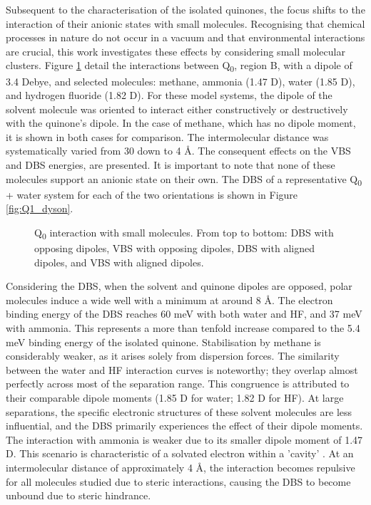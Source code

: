 Subsequent to the characterisation of the isolated quinones, the focus shifts to the interaction of their anionic states with small molecules. Recognising that chemical processes in nature do not occur in a vacuum and that environmental interactions are crucial, this work investigates these effects by considering small molecular clusters. Figure \ref{fig:scan_X} detail the interactions between Q\textsubscript{0}, region B, with a dipole of 3.4 Debye, and selected molecules: methane, ammonia (1.47 D), water (1.85 D), and hydrogen fluoride (1.82 D). For these model systems, the dipole of the solvent molecule was oriented to interact either constructively or destructively with the quinone's dipole. In the case of methane, which has no dipole moment, it is shown in both cases for comparison. The intermolecular distance was systematically varied from 30 down to 4 \r{A}. The consequent effects on the VBS and DBS energies, are presented. It is important to note that none of these molecules support an anionic state on their own. The DBS of a representative Q\textsubscript{0} + water system for each of the two orientations is shown in Figure \ref{fig:Q1_dyson}.

\begin{figure}[th!]
    \centering
    \small
    
    \caption[Q\textsubscript{0} interaction with small molecules]{Q\textsubscript{0} interaction with small molecules. From top to bottom: DBS with opposing dipoles, VBS with opposing dipoles, DBS with aligned dipoles, and VBS with aligned dipoles.}
    \label{fig:scan_X}
\end{figure}

Considering the DBS, when the solvent and quinone dipoles are opposed, polar molecules induce a wide well with a minimum at around 8 \r{A}. The electron binding energy of the DBS reaches 60 meV with both water and HF, and 37 meV with ammonia. This represents a more than tenfold increase compared to the 5.4 meV binding energy of the isolated quinone. Stabilisation by methane is considerably weaker, as it arises solely from dispersion forces. The similarity between the water and HF interaction curves is noteworthy; they overlap almost perfectly across most of the separation range. This congruence is attributed to their comparable dipole moments (1.85 D for water; 1.82 D for HF). At large separations, the specific electronic structures of these solvent molecules are less influential, and the DBS primarily experiences the effect of their dipole moments. The interaction with ammonia is weaker due to its smaller dipole moment of 1.47 D. This scenario is characteristic of a solvated electron within a 'cavity' \cite{jordan2003theory,herbert2019structure}. At an intermolecular distance of approximately 4 \r{A}, the interaction becomes repulsive for all molecules studied due to steric interactions, causing the DBS to become unbound due to steric hindrance.

